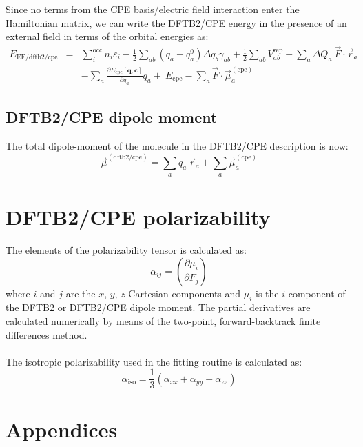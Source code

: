 \documentclass{article}
\numberwithin{equation}{section}
\begin{document}
Since no terms from the CPE basis/electric field interaction enter the Hamiltonian matrix, we can write the DFTB2/CPE energy in the presence of an external field in terms of the orbital energies as:
\begin{eqnarray}
    E_\mathrm{EF/dftb2/cpe}  
    &=& \sum_i^\mathrm{occ} n_i \varepsilon_i - \frac{1}{2}\sum_{ab} \left(q_a + q_a^0 \right)\Delta q_b \gamma_{ab} + \frac{1}{2} \sum_{ab} V^\mathrm{rep}_{ab} -\sum_a \Delta Q_a\ \vec{F} \cdot \vec{r}_a\nonumber\\
    && - \sum_a  \frac{\partial E_{\mathrm{cpe}}\left[\mathbf{q}, \mathbf{c}\right]}{\partial q_a} q_a +\ E_{\mathrm{cpe}} - \sum_a \vec{F} \cdot \vec{\mu}^{\mathrm{(cpe)}}_a
\end{eqnarray}


\subsection{DFTB2/CPE dipole moment}
The total dipole-moment of the molecule in the DFTB2/CPE description is now:
\begin{equation}
    \vec{\mu}^{\mathrm{(dftb2/cpe)}} = \sum_a q_a\ \vec{r}_a + \sum_a \vec{\mu}^{\mathrm{(cpe)}}_a
\end{equation}


\clearpage
\section{DFTB2/CPE polarizability}
The elements of the polarizability tensor is calculated as:
\begin{equation}
    \alpha_{ij} = \left(\frac{\partial \mu_i }{\partial F_j}\right)
\end{equation}
where $i$ and $j$ are the $x$, $y$, $z$ Cartesian components and $\mu_i$ is the $i$-component of the DFTB2 or DFTB2/CPE dipole moment.
The partial derivatives are calculated numerically by means of the two-point, forward-backtrack finite differences method.
\\\\The isotropic polarizability used in the fitting routine is calculated as:
\begin{equation}
    \alpha_{\mathrm{iso}} = \frac{1}{3} \left( \alpha_{xx} +\alpha_{yy} + \alpha_{zz}  \right)
\end{equation}






\clearpage
\section*{Appendices}
\appendix
\end{document}
